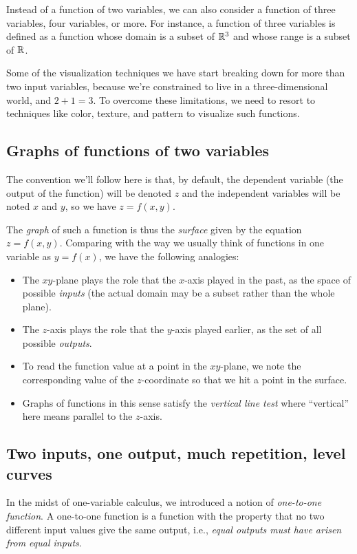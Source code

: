 \documentclass[10pt]{amsart}
\begin{document}
Instead of a function of two variables, we can also consider a
function of three variables, four variables, or more. For instance, a
function of three variables is defined as a function whose domain is a
subset of $\mathbb{R}^3$ and whose range is a subset of $\mathbb{R}$.

Some of the visualization techniques we have start breaking down for
more than two input variables, because we're constrained to live in a
three-dimensional world, and $2 + 1 = 3$. To overcome these
limitations, we need to resort to techniques like color, texture, and
pattern to visualize such functions.

\subsection{Graphs of functions of two variables}

The convention we'll follow here is that, by default, the dependent
variable (the output of the function) will be denoted $z$ and the
independent variables will be noted $x$ and $y$, so we have $z =
f(x,y)$.

The {\em graph} of such a function is thus the {\em surface} given by
the equation $z = f(x,y)$. Comparing with the way we usually think of
functions in one variable as $y = f(x)$, we have the following
analogies:

\begin{itemize}
\item The $xy$-plane plays the role that the $x$-axis played in the
  past, as the space of possible {\em inputs} (the actual domain may
  be a subset rather than the whole plane).
\item The $z$-axis plays the role that the $y$-axis played earlier, as
  the set of all possible {\em outputs}.
\item To read the function value at a point in the $xy$-plane, we note
  the corresponding value of the $z$-coordinate so that we hit a point
  in the surface.
\item Graphs of functions in this sense satisfy the {\em vertical line
  test} where ``vertical'' here means parallel to the $z$-axis.
\end{itemize}

\subsection{Two inputs, one output, much repetition, level curves}

In the midst of one-variable calculus, we introduced a notion of {\em
one-to-one function}. A one-to-one function is a function with the
property that no two different input values give the same output,
i.e., {\em equal outputs must have arisen from equal inputs}.
\end{document}
